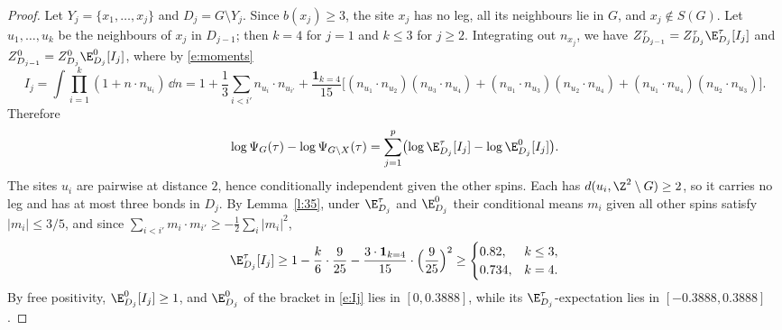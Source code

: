 \begin{proof}
Let $Y_j = \{x_1, \dots, x_j\}$ and $D_j = G \setminus Y_j$. Since $b(x_j) \ge 3$, the site $x_j$ has no leg, all its neighbours lie in $G$, and $x_j \notin S(G)$. Let $u_1, \dots, u_k$ be the neighbours of $x_j$ in $D_{j - 1}$; then $k = 4$ for $j = 1$ and $k \le 3$ for $j \ge 2$. Integrating out $n_{x_j}$, we have $Z^\tau_{D_{j - 1}} = Z^\tau_{D_j} \E^\tau_{D_j}[I_j]$ and $Z^0_{D_{j - 1}} = Z^0_{D_j} \E^0_{D_j}[I_j]$, where by \eqref{e:moments}
\begin{equation}\label{e:Ij}
I_j = \int \prod_{i = 1}^k (1 + n \cdot n_{u_i}) \, \dd n = 1 + \frac13 \sum_{i < i'} n_{u_i} \cdot n_{u_{i'}} + \frac{\mathbf 1_{k = 4}}{15} \bigl[ (n_{u_1} \cdot n_{u_2})(n_{u_3} \cdot n_{u_4}) + (n_{u_1} \cdot n_{u_3})(n_{u_2} \cdot n_{u_4}) + (n_{u_1} \cdot n_{u_4})(n_{u_2} \cdot n_{u_3}) \bigr].
\end{equation}
Therefore
\begin{equation}\label{e:telescope}
\log \Psi_G(\tau) - \log \Psi_{G \setminus X}(\tau) = \sum_{j = 1}^p \bigl( \log \E^\tau_{D_j}[I_j] - \log \E^0_{D_j}[I_j] \bigr).
\end{equation}
The sites $u_i$ are pairwise at distance $2$, hence conditionally independent given the other spins. Each has $d(u_i, \Z^2 \setminus G) \ge 2$, so it carries no leg and has at most three bonds in $D_j$. By Lemma~\ref{l:35}, under $\E^\tau_{D_j}$ and $\E^0_{D_j}$ their conditional means $m_i$ given all other spins satisfy $|m_i| \le 3/5$, and since $\sum_{i < i'} m_i \cdot m_{i'} \ge -\frac12 \sum_i |m_i|^2$,
\begin{equation*}
\E^\tau_{D_j}[I_j] \ge 1 - \frac{k}{6} \cdot \frac{9}{25} - \frac{3 \cdot \mathbf 1_{k = 4}}{15} \cdot \Bigl( \frac{9}{25} \Bigr)^2 \ge \begin{cases} 0.82, & k \le 3, \\ 0.734, & k = 4 . \end{cases}
\end{equation*}
By free positivity, $\E^0_{D_j}[I_j] \ge 1$, and $\E^0_{D_j}$ of the bracket in \eqref{e:Ij} lies in $[0, 0.3888]$, while its $\E^\tau_{D_j}$-expectation lies in $[-0.3888, 0.3888]$.


\end{proof}
